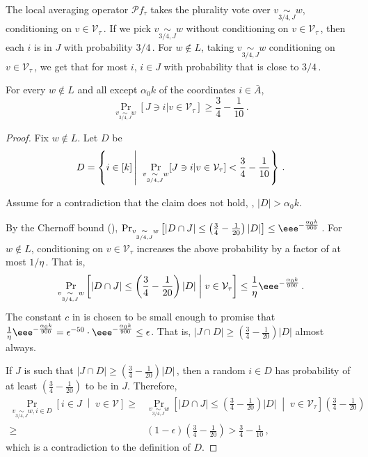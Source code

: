 \documentclass{toc}
\newcommand{\Prob}[2][]{\Pr_{{#1}}\left[#2\right]} %
\newcommand{\Paren}[1]{\left(#1\right)} %
\newcommand{\abs}[1]{\lvert#1\rvert} %
\newcommand{\given}{\;\middle\vert\;} %
\newcommand\sett[2]{\left\{ #1 \left| \; \vphantom{#1 #2} \right. #2  \right\}} %
\newcommand\f{f} %
\newcommand\bh{\mathcal{P}\f_\tau} %
\newcommand\cons{\mathcal{V}} %
\newcommand\cor[1]{\underset{\scriptscriptstyle#1}{\sim}} %
\newcommand\rest[1]{{\bar{#1}}}  %
\def\eps{\epsilon}
\begin{document}
The local averaging operator $\bh$ takes the plurality vote over $v\cor{3/4,J}w$, conditioning on $v\in \cons_\tau$\,. If we pick $v\cor{3/4,J}w$ without conditioning on $v\in\cons_\tau$\,, then each $i$ is in $J$ with probability 
%
$3/4$\,. %
 For $w\notin L$, taking $v\cor{3/4,J}w$ conditioning on $v\in\cons_\tau$\,, we get that for most $i$, $i\in J$ with probability that is close to 
%
$3/4$\,. %
\begin{claim}\label{claim:almost 3 over 4}
   For every $w\notin L$ and all except $\alpha_0 k$ of the coordinates $i\in\rest{A}$,
   \[ \Pr_{v\cor{3/4,J}w}[J\ni i | v\in\cons_\tau] \geq \frac{3}{4}-\frac{1}{10}\,. \]%
\end{claim}
\begin{proof}
    Fix $w\notin L$. Let $D$ be
    \[ D = \sett{i\in [k]}{\Pr_{v\cor{3/4,J}w}[J\ni i | v\in\cons_\tau] < \frac{3}{4}-\frac{1}{10}}\,.\] %
    
Assume %
for  %
a contradiction that the claim does not hold, \ie, $\abs{D} > \alpha_0 k$.
    
%
%
%
%
%
By the Chernoff bound (), %
$\Prob[v\cor{3/4,J}w]{\abs{D\cap J} \leq \Paren{\frac{3}{4} - \frac{1}{20}}\abs{D}} 
    \leq \eee^{-\frac{\alpha_0 k}{900}}$\,.
    For $w\notin L$, conditioning on $v\in \cons_\tau$ increases the above probability by a factor of at most 
    $1/\eta$\,. %
    That is,
    \[ \Prob[v\cor{3/4,J}w]{\abs{D\cap J} \leq \Paren{\frac{3}{4} - \frac{1}{20}}\abs{D}\given v\in\cons_\tau} \leq \frac{1}{\eta} \eee^{-\frac{\alpha_0 k}{900}}\,.\]%
    The constant $c$ in is chosen to be small enough to promise that $\frac{1}{\eta} \eee^{-\frac{\alpha_0 k}{900}} = \eps^{-50}\cdot \eee^{-\frac{\alpha_0 k}{900}}\leq \epsilon$. That is, $\abs{J\cap D}\geq \Paren{\frac{3}{4} - \frac{1}{20}}\abs{D}$ almost always.
	
	If $J$ is such that $\abs{J\cap D}\geq \Paren{\frac{3}{4} - \frac{1}{20}}\abs{D}$\,, then a random $i\in D$ has probability of at least $\Paren{\frac{3}{4} - \frac{1}{20}}$ to be in $J$. Therefore,
	\begin{align*}
	   \Prob[v\cor{3/4,J}w,i\in D]{i\in J\given v\in\cons} \geq& \Prob[v\cor{3/4,J}w]{\abs{D\cap J} \leq \Paren{\frac{3}{4} - \frac{1}{20}}\abs{D}\given v\in\cons_\tau} \Paren{\frac{3}{4} - \frac{1}{20}}\\
	   \geq& (1-\epsilon)\Paren{\frac{3}{4} - \frac{1}{20}} > \frac{3}{4}-\frac{1}{10}\,, %
	\end{align*}
	which is a contradiction to the definition of $D$.
\end{proof}
\end{document}
